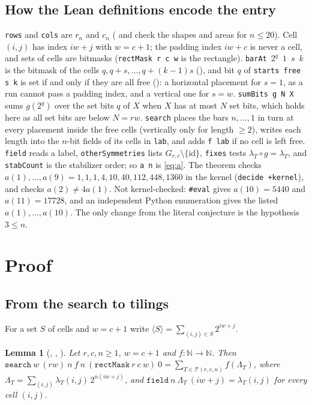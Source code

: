 \documentclass[11pt]{amsart}
\theoremstyle{plain}
\newtheorem{lemma}[theorem]{Lemma}
\theoremstyle{definition}
\newcommand{\code}[1]{\texttt{#1}}
\newcommand{\T}{\mathcal{T}}
\begin{document}
\subsection*{How the Lean definitions encode the entry}
\code{rows} and \code{cols} are $r_n$ and $c_n$ ( and  check the shapes and areas for $n\le20$). Cell $(i,j)$ has index $iw+j$ with $w=c+1$; the padding index $iw+c$ is never a cell, and sets of cells are bitmasks (\code{rectMask r c w} is the rectangle). \code{barAt}~$2^q$~$1$~$s$~$k$ is the bitmask of the cells $q,q+s,\dots,q+(k-1)s$ (), and bit $q$ of \code{starts free s k} is set if and only if they are all free (): a horizontal placement for $s=1$, as a run cannot pass a padding index, and a vertical one for $s=w$. \code{sumBits g N X} sums $g(2^q)$ over the set bits $q$ of $X$ when $X$ has at most $N$ set bits, which holds here as all set bits are below $N=rw$. \code{search} places the bars $n,\dots,1$ in turn at every placement inside the free cells (vertically only for length $\ge2$), writes each length into the $n$-bit fields of its cells in \code{lab}, and adds \code{f lab} if no cell is left free. \code{field} reads a label, \code{otherSymmetries} lists $G_{r,c}\setminus\{\mathrm{id}\}$, \code{fixes} tests $\lambda_T\circ g=\lambda_T$, and \code{stabCount} is the stabilizer order; so \code{a n} is \eqref{eq:a}. The theorem  checks $a(1),\dots,a(9)=1,1,1,4,10,40,112,448,1360$ in the kernel (\texttt{decide +kernel}), and  checks $a(2)\ne4a(1)$. Not kernel-checked: \texttt{\#eval} gives $a(10)=5440$ and $a(11)=17728$, and an independent Python enumeration gives the listed $a(1),\dots,a(10)$. The only change from the literal conjecture is the hypothesis $3\le n$.

\section{Proof}\label{sec:proof}

\subsection{From the search to tilings}
For a set $S$ of cells and $w=c+1$ write $\langle S\rangle=\sum_{(i,j)\in S}2^{iw+j}$.

\begin{lemma}[, , ]\label{lem:search}
Let $r,c,n\ge1$, $w=c+1$ and $f:\mathbb N\to\mathbb N$. Then
$\code{search}\ w\ (rw)\ n\ f\ n\ (\code{rectMask}\ r\ c\ w)\ 0=\sum_{T\in\T(r,c,n)}f(\Lambda_T)$, where $\Lambda_T=\sum_{(i,j)}\lambda_T(i,j)\,2^{n(iw+j)}$, and $\code{field}\ n\ \Lambda_T\ (iw+j)=\lambda_T(i,j)$ for every cell $(i,j)$.
\end{lemma}
\end{document}

